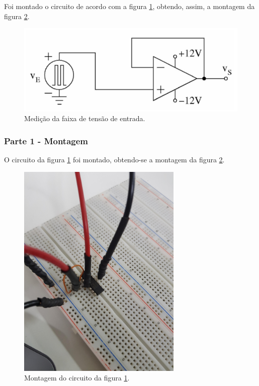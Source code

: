 \documentclass{abntex2}
\begin{document}
Foi montado o circuito de acordo com a figura \ref{fig:circuito6}, obtendo, assim, a montagem da figura \ref{fig:montagem7}.

\begin{figure}[h]
  \centering
  \includegraphics[scale = 0.5]{exp5.png}
  \caption{Medição da faixa de tensão de entrada.}
  \label{fig:circuito6}
\end{figure}

\subsubsection{Parte 1 - Montagem}

O circuito da figura \ref{fig:circuito6} foi montado, obtendo-se a montagem da figura \ref{fig:montagem7}.

\begin{figure}[h]
  \centering
  \includegraphics[width = 0.7\textwidth]{circ_5.jpg}
  \caption{Montagem do circuito da figura \ref{fig:circuito6}.}
  \label{fig:montagem7}
\end{figure}
\end{document}
